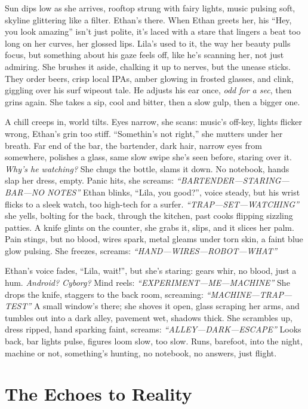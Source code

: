 \documentclass[12pt]{article}
\begin{document}
{Sun dips low as she arrives, rooftop strung with fairy lights, music pulsing soft, skyline glittering like a filter. \textnormal{Ethan}’s there. When \textnormal{Ethan} greets her, his “Hey, you look amazing” isn’t just polite, it’s laced with a stare that lingers a beat too long on her curves, her glossed lips. \textnormal{Lila}’s used to it, the way her beauty pulls focus, but something about his gaze feels off, like he’s scanning her, not just admiring. She brushes it aside, chalking it up to nerves, but the unease sticks. They order beers, crisp local IPAs, amber glowing in frosted glasses, and clink, giggling over his surf wipeout tale. He adjusts his ear once, \textit{odd for a sec}, then grins again. She takes a sip, cool and bitter, then a slow gulp, then a bigger one.

A chill creeps in, world tilts. Eyes narrow, she scans: music’s off-key, lights flicker wrong, \textnormal{Ethan}’s grin too stiff. “Somethin’s not right,” she mutters under her breath. Far end of the bar, the bartender, dark hair, narrow eyes from somewhere, polishes a glass, same slow swipe she’s seen before, staring over it. \textit{Why’s he watching?} She chugs the bottle, slams it down. No notebook, hands slap her dress, empty. Panic hits, she screams: \textit{“BARTENDER—STARING—BAR—NO NOTES”} \textnormal{Ethan} blinks, “Lila, you good?”, voice steady, but his wrist flicks to a sleek watch, too high-tech for a surfer. \textit{“TRAP—SET—WATCHING”} she yells, bolting for the back, through the kitchen, past cooks flipping sizzling patties. A knife glints on the counter, she grabs it, slips, and it slices her palm. Pain stings, but no blood, wires spark, metal gleams under torn skin, a faint blue glow pulsing. She freezes, screams: \textit{“HAND—WIRES—ROBOT—WHAT”}

\textnormal{Ethan}’s voice fades, “Lila, wait!”, but she’s staring: gears whir, no blood, just a hum. \textit{Android? Cyborg?} Mind reels: \textit{“EXPERIMENT—ME—MACHINE”} She drops the knife, staggers to the back room, screaming: \textit{“MACHINE—TRAP—TEST”} A small window’s there; she shoves it open, glass scraping her arms, and tumbles out into a dark alley, pavement wet, shadows thick. She scrambles up, dress ripped, hand sparking faint, screams: \textit{“ALLEY—DARK—ESCAPE”} Looks back, bar lights pulse, figures loom slow, too slow. Runs, barefoot, into the night, machine or not, something’s hunting, no notebook, no answers, just flight.

\part{The Echoes to Reality}

}
\end{document}
